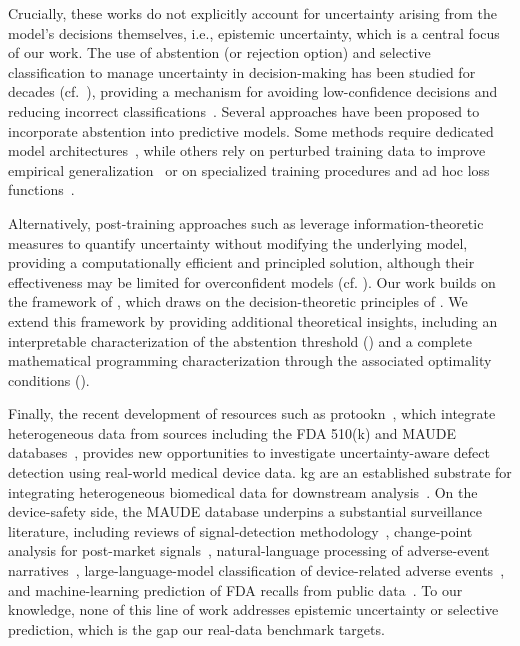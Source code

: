 Crucially, these works do not explicitly account for uncertainty arising from the model's decisions themselves, i.e., epistemic uncertainty, which is a central focus of our work. The use of abstention (or rejection option) and selective classification to manage uncertainty in decision-making has been studied for decades (cf.~\cite{Flores1958TEC,Chow1970TIT,vovk2005algorithmic,angelopoulos2023conformal,bates2021distribution,elyaniv2010foundations}), providing a mechanism for avoiding low-confidence decisions and reducing incorrect classifications~\cite{PudilNBK1992ICPR}.
Several approaches have been proposed to incorporate abstention into predictive models. Some methods require dedicated model architectures~\cite{CorbiereTBCP2019NeurIPS,GeifmanE2019ICML}, while others rely on perturbed training data to improve empirical generalization~\cite{HuangZZ2020NeurIPS,FischJB2022CORR} or on specialized training procedures and ad hoc loss functions~\cite{FengAHA2022CORR}.

Alternatively, post-training approaches such as \cite{GraneseRGPP2021NeurIPS} leverage information-theoretic measures to quantify uncertainty without modifying the underlying model, providing a computationally efficient and principled solution, although their effectiveness may be limited for overconfident models (cf. \cite{GuoPSW2017ICML}).
Our work builds on the framework of \cite{liu2019deep}, which draws on the decision-theoretic principles of \cite{markowitz1952portfolio}. We extend this framework by providing additional theoretical insights, including an interpretable characterization of the abstention threshold () and a complete mathematical programming characterization through the associated optimality conditions ().

Finally, the recent development of resources such as \gls*{protookn}~\cite{protookn,oknregistry}, which integrate heterogeneous data from sources including the FDA 510(k) and MAUDE databases~\cite{fda_510k,fda_maude}, provides new opportunities to investigate uncertainty-aware defect detection using real-world medical device data. \gls*{kg} are an established substrate for integrating heterogeneous biomedical data for downstream analysis~\cite{nicholson2020constructing}. On the device-safety side, the MAUDE database underpins a substantial surveillance literature, including reviews of signal-detection methodology~\cite{chung2020signal}, change-point analysis for post-market signals~\cite{xu2015changepoint}, natural-language processing of adverse-event narratives~\cite{mao2021nlp}, large-language-model classification of device-related adverse events~\cite{sohoni2026llm}, and machine-learning prediction of FDA recalls from public data~\cite{slivinskis2025recall}. To our knowledge, none of this line of work addresses epistemic uncertainty or selective prediction, which is the gap our real-data benchmark targets.

